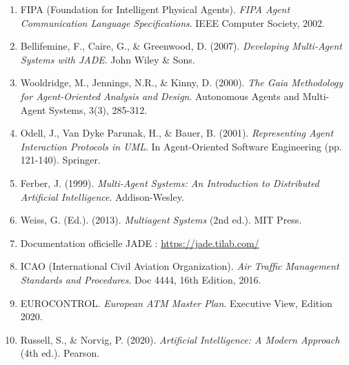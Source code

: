 \documentclass[12pt,a4paper]{article}
\begin{document}
\begin{enumerate}[leftmargin=*]
    \item FIPA (Foundation for Intelligent Physical Agents). \textit{FIPA Agent Communication Language Specifications}. IEEE Computer Society, 2002.

    \item Bellifemine, F., Caire, G., \& Greenwood, D. (2007). \textit{Developing Multi-Agent Systems with JADE}. John Wiley \& Sons.

    \item Wooldridge, M., Jennings, N.R., \& Kinny, D. (2000). \textit{The Gaia Methodology for Agent-Oriented Analysis and Design}. Autonomous Agents and Multi-Agent Systems, 3(3), 285-312.

    \item Odell, J., Van Dyke Parunak, H., \& Bauer, B. (2001). \textit{Representing Agent Interaction Protocols in UML}. In Agent-Oriented Software Engineering (pp. 121-140). Springer.

    \item Ferber, J. (1999). \textit{Multi-Agent Systems: An Introduction to Distributed Artificial Intelligence}. Addison-Wesley.

    \item Weiss, G. (Ed.). (2013). \textit{Multiagent Systems} (2nd ed.). MIT Press.

    \item Documentation officielle JADE : \url{https://jade.tilab.com/}

    \item ICAO (International Civil Aviation Organization). \textit{Air Traffic Management Standards and Procedures}. Doc 4444, 16th Edition, 2016.

    \item EUROCONTROL. \textit{European ATM Master Plan}. Executive View, Edition 2020.

    \item Russell, S., \& Norvig, P. (2020). \textit{Artificial Intelligence: A Modern Approach} (4th ed.). Pearson.
\end{enumerate}
\end{document}

